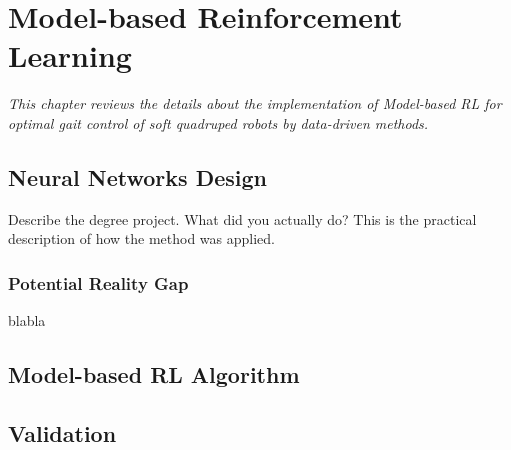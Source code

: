 \chapter{Model-based Reinforcement Learning}
\label{chap4}
\textit{This chapter reviews the details about the implementation of Model-based \ac{RL} for optimal gait control of soft quadruped robots by data-driven methods.}
\section{Neural Networks Design}
Describe the degree project. What did you actually do? This is the practical description of how the method was applied.


\subsection{Potential Reality Gap}
blabla

\section{Model-based RL Algorithm}

\section{Validation}